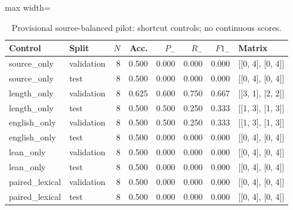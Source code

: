 \begin{table}[htbp]
\centering
\caption{Provisional source-balanced pilot: shortcut controls; no continuous scores.}
\label{tab:pilot-controls}
\small
\begin{adjustbox}{max width=\textwidth}
\begin{tabular}{llrrrrrl}
\toprule
Control & Split & $N$ & Acc. & $P_-$ & $R_-$ & $F1_-$ & Matrix \\
\midrule
source\_only & validation & 8 & 0.500 & 0.000 & 0.000 & 0.000 & [[0, 4], [0, 4]] \\
source\_only & test & 8 & 0.500 & 0.000 & 0.000 & 0.000 & [[0, 4], [0, 4]] \\
length\_only & validation & 8 & 0.625 & 0.600 & 0.750 & 0.667 & [[3, 1], [2, 2]] \\
length\_only & test & 8 & 0.500 & 0.500 & 0.250 & 0.333 & [[1, 3], [1, 3]] \\
english\_only & validation & 8 & 0.500 & 0.500 & 0.250 & 0.333 & [[1, 3], [1, 3]] \\
english\_only & test & 8 & 0.500 & 0.000 & 0.000 & 0.000 & [[0, 4], [0, 4]] \\
lean\_only & validation & 8 & 0.500 & 0.000 & 0.000 & 0.000 & [[0, 4], [0, 4]] \\
lean\_only & test & 8 & 0.500 & 0.000 & 0.000 & 0.000 & [[0, 4], [0, 4]] \\
paired\_lexical & validation & 8 & 0.500 & 0.000 & 0.000 & 0.000 & [[0, 4], [0, 4]] \\
paired\_lexical & test & 8 & 0.500 & 0.000 & 0.000 & 0.000 & [[0, 4], [0, 4]] \\
\bottomrule
\end{tabular}
\end{adjustbox}
\end{table}
